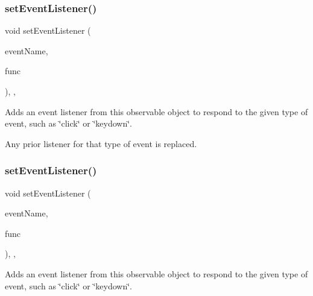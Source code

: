 \subsubsection{\texorpdfstring{set\+Event\+Listener()}{setEventListener()}\hspace{0.1cm}{\footnotesize\ttfamily [1/2]}}
{\footnotesize\ttfamily void set\+Event\+Listener (\begin{DoxyParamCaption}\item[{const std\+::string \&}]{event\+Name,  }\item[{\mbox{\hyperlink{namespacesgl_ae9f3e9eab70035da1a2b114e21357b25}{G\+Event\+Listener}}}]{func }\end{DoxyParamCaption})\hspace{0.3cm}{\ttfamily [protected]}, {\ttfamily [virtual]}, {\ttfamily [inherited]}}



Adds an event listener from this observable object to respond to the given type of event, such as \char`\"{}click\char`\"{} or \char`\"{}keydown\char`\"{}. 

Any prior listener for that type of event is replaced. \mbox{\label{classsgl_1_1GObservable_abac4cb9f9e626e010e87f5d91573c8a5}} 
\subsubsection{\texorpdfstring{set\+Event\+Listener()}{setEventListener()}\hspace{0.1cm}{\footnotesize\ttfamily [2/2]}}
{\footnotesize\ttfamily void set\+Event\+Listener (\begin{DoxyParamCaption}\item[{const std\+::string \&}]{event\+Name,  }\item[{\mbox{\hyperlink{namespacesgl_a54427ce97bb1c2804e4fe2b0a62e8b17}{G\+Event\+Listener\+Void}}}]{func }\end{DoxyParamCaption})\hspace{0.3cm}{\ttfamily [protected]}, {\ttfamily [virtual]}, {\ttfamily [inherited]}}



Adds an event listener from this observable object to respond to the given type of event, such as \char`\"{}click\char`\"{} or \char`\"{}keydown\char`\"{}. 

